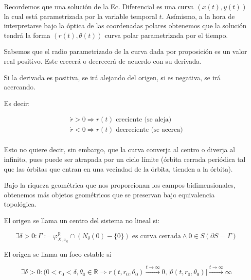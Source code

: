 \begin{rmrk}
	Recordemos que una solución de la Ec. Diferencial es una curva $(x(t),y(t))$ la cual está parametrizada por la variable temporal $t$. Asímismo, a la hora de interpretarse bajo la óptica de las coordenadas polares obtenemos que la solución tendrá la forma  $(r(t),\theta(t))$ curva polar parametrizada por el tiempo. 
\end{rmrk}

\begin{rmrk}
	Sabemos que el radio parametrizado de la curva dada por proposición es un valor real positivo. Este crecerá o decrecerá de acuerdo con su derivada.
	
	Si la derivada es positiva, se irá alejando del origen, si es negativa, se irá acercando.
	
	Es decir:
	
	\begin{align*}
		\dot{r} > 0 \Rightarrow r(t) \text{ creciente (se aleja)} \\
		\dot{r} < 0 \Rightarrow r(t) \text{ decreciente (se acerca)} \\
	\end{align*}
	
	Esto no quiere decir, sin embargo, que la curva converja al centro o diverja al infinito, pues puede ser atrapada por un ciclo límite (órbita cerrada periódica tal que las órbitas que entran en una vecindad de la órbita, tienden a la órbita).
\end{rmrk}

\begin{rmrk}
	Bajo la riqueza geométrica que nos proporcionan los campos bidimensionales, obtenemos más objetos geométricos que se preservan bajo equivalencia topológica.
\end{rmrk}

\begin{defn}[Centro]
	El origen se llama un centro del sistema no lineal si:
	
	\begin{equation*}
		\exists \delta>0 : \Gamma :=\varphi^{\mathbb{R}}_{X,x_0}\cap (N_\delta(0)-\{0\}) \text{ es curva cerrada} \land 0\in S(\partial S = \Gamma)
	\end{equation*}
\end{defn}

\begin{defn}
	El origen se llama un foco estable si
	
	\begin{equation*}
		\exists \delta>0: (0 < r_0 < \delta , \theta_0 \in \mathbb{R} \Rightarrow r(t,r_0,\theta_0) \overset{t\to \infty}{\to} 0 , |\theta(t,r_0,\theta_0)| \overset{t\to \infty}{\to} \infty 
	\end{equation*}
\end{defn}

